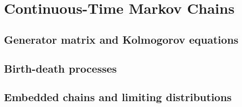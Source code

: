 
\section{Continuous-Time Markov Chains}

\subsection{Generator matrix and Kolmogorov equations}


\subsection{Birth-death processes}


\subsection{Embedded chains and limiting distributions}

